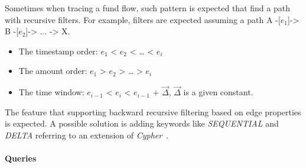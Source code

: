 
Sometimes when tracing a fund flow, such pattern is expected that find a path
with recursive filters. For example, filters are expected assuming a path A
-[${e_1}$]-> B -[${e_2}$]-> ... -> X.

\begin{itemize}
    \item The timestamp order: ${e_1}$ < ${e_2}$ < … < ${e_i}$
    \item The amount order: ${e_1}$ > ${e_2}$ > … > ${e_i}$
    \item The time window: ${e_{i-1}}$ < ${e_i}$ < ${e_{i-1}}$ + $\vec{\Delta}$,
    $\vec{\Delta}$ is a given constant.
\end{itemize}


The feature that supporting backward recursive filtering based on edge
properties is expected. A possible solution is adding keywords like
\emph{SEQUENTIAL} and \emph{DELTA} referring to an extension of
\emph{Cypher}~\cite{tcypher}.


\paragraph{Queries}
{\raggedright
}